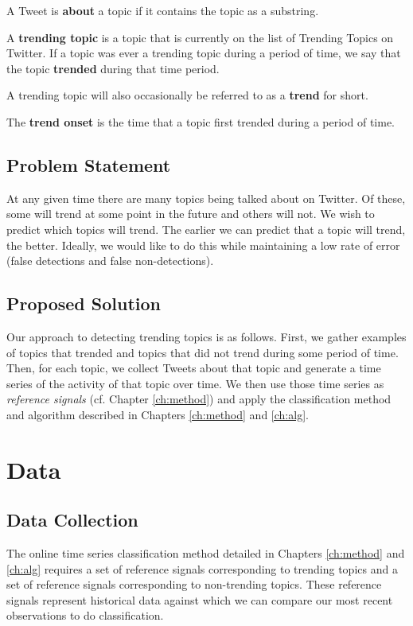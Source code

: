 \begin{defn}
A Tweet is {\bf about} a topic if it contains the topic as a substring.
\end{defn}

\begin{defn}
A {\bf trending topic} is a topic that is currently on the list of Trending
Topics on Twitter. If a topic was ever a trending topic during a period of time,
we say that the topic {\bf trended} during that time period.
\end{defn}

\begin{defn}[Trend] A trending topic will also occasionally be referred to as a {\bf trend}
  for short.
\end{defn}

\begin{defn}
  The {\bf trend onset} is the time that a topic first trended during a
  period of time.
\end{defn}


\subsection{Problem Statement}
At any given time there are many topics being talked about on Twitter. Of these,
some will trend at some point in the future and others will not. We wish to
predict which topics will trend. The earlier we can predict that a topic will
trend, the better. Ideally, we would like to do this while maintaining a low
rate of error (false detections and false non-detections).

\subsection{Proposed Solution}
Our approach to detecting trending topics is as follows. First, we gather
examples of topics that trended and topics that did not trend during
some period of time. Then, for each topic, we collect Tweets about that topic
and generate a time series of the activity of that topic over time. We then use
those time series as {\em reference signals} (cf. Chapter \ref{ch:method}) and
apply the classification method and algorithm described in Chapters
\ref{ch:method} and \ref{ch:alg}.

\section{Data}
\subsection{Data Collection}
The online time series classification method detailed in Chapters
\ref{ch:method} and \ref{ch:alg} requires a set of reference signals
corresponding to trending topics and a set of reference signals corresponding to
non-trending topics. These reference signals represent historical data against
which we can compare our most recent observations to do classification.


